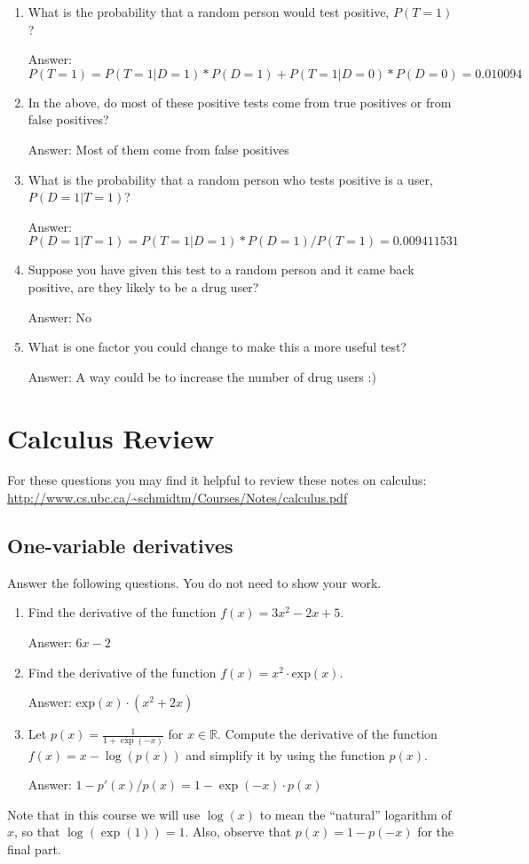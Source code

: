 \documentclass{article}
\def\ans#1{\par\gre{Answer: #1}}
\def\blu#1{{\color{blu}#1}}
\def\gre#1{{\color{gre}#1}}
\def\R{\mathbb{R}}
\begin{document}
\begin{enumerate}
\item What is the probability that a random person would test positive, $P(T=1)$?
\ans{$P(T=1) = P(T=1|D=1)*P(D=1) + P(T=1|D=0)*P(D=0) = 0.010094$ }
\item In the above, do most of these positive tests come from true positives or from false positives?
\ans{Most of them come from false positives}
\item What is the probability that a random person who tests positive is a user, $P(D=1|T=1)$?
\ans{$P(D=1|T=1) = P(T=1|D=1) * P(D=1) / P(T=1) =  0.009411531$}
\item Suppose you have given this test to a random person and it came back positive, are they likely to be a drug user?
\ans{No}
\item What is one factor you could change to make this a more useful test?
\ans{A way could be to increase the number of drug users :)}
\end{enumerate}

\pagebreak

\section{Calculus Review}

For these questions you may find it helpful to review these notes on calculus:\\
\url{http://www.cs.ubc.ca/~schmidtm/Courses/Notes/calculus.pdf}\\


\subsection{One-variable derivatives}

\blu{Answer the following questions.} You do not need to show your work.

\begin{enumerate}
\item Find the derivative of the function $f(x) = 3x^2 -2x + 5$.
\ans{$6x -2$}
\item Find the derivative of the function $f(x) = x^2 \cdot \textrm{exp}(x)$.
\ans{$\textrm{exp}(x) \cdot (x^2+2x)$}
\item Let $p(x) = \frac{1}{1+\exp(-x)}$ for $x \in \R$. Compute the derivative of the function $f(x) = x-\log(p(x))$ and simplify it by using the function $p(x)$.
\ans{$1 - p'(x)/p(x) = 1 - \exp(-x) \cdot p(x)$}
\end{enumerate}
Note that in this course we will use $\log(x)$ to mean the ``natural'' logarithm of $x$, so that $\log(\exp(1)) = 1$. Also, observe that $p(x) = 1-p(-x)$ for the final part.
\end{document}

